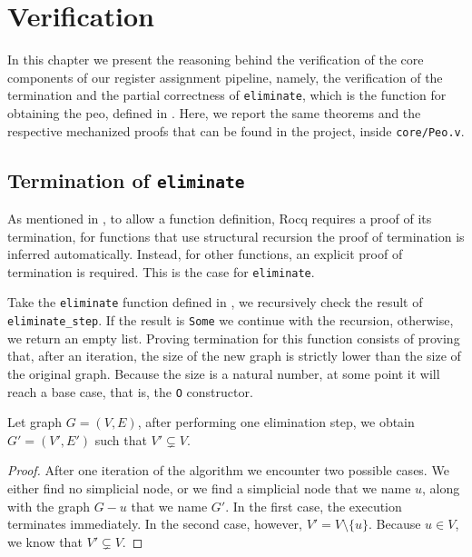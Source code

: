 
\chapter{Verification}
\label{cha:verification}

In this chapter we present the reasoning behind the verification of the core components of our register assignment pipeline, namely, the verification of the termination and the partial correctness of \texttt{eliminate}, which is the function for obtaining the \gls{peo}, defined in . Here, we report the same theorems and the respective mechanized proofs that can be found in the project, inside \texttt{core/Peo.v}.

\section{Termination of \texttt{eliminate}}

As mentioned in , to allow a function definition, Rocq requires a proof of its termination, for functions that use structural recursion the proof of termination is inferred automatically. Instead, for other functions, an explicit proof of termination is required. This is the case for \texttt{eliminate}.

Take the \texttt{eliminate} function defined in , we recursively check the result of \texttt{eliminate\_step}. If the result is \texttt{Some} we continue with the recursion, otherwise, we return an empty list. Proving termination for this function consists of proving that, after an iteration, the size of the new graph is strictly lower than the size of the original graph. Because the size is a natural number, at some point it will reach a base case, that is, the \texttt{O} constructor.

\begin{theorem}\label{thm:term-elim}
    Let graph $G = (V, E)$, after performing one elimination step, we obtain $G' = (V', E')$ such that $V' \subsetneq V$. \Coqed
\end{theorem}
\begin{proof}
    After one iteration of the algorithm we encounter two possible cases. We either find no simplicial node, or we find a simplicial node that we name $u$, along with the graph $G - u$ that we name $G'$. In the first case, the execution terminates immediately. In the second case, however, $V' = V \setminus \{ u \}$. Because $u \in V$, we know that $V' \subsetneq V$.
\end{proof}

